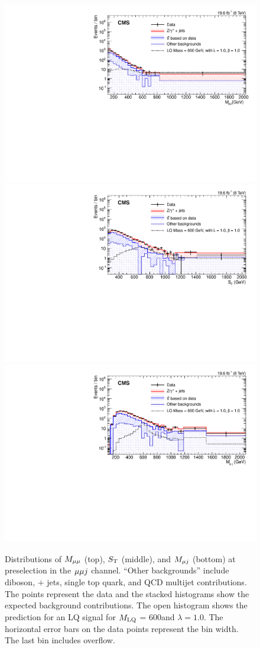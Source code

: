 \begin{figure}[!htb]
       \centering
       {\includegraphics[width=.75\textwidth]{Figures/Figures_mumu_M_muon1muon2_Preselection.pdf}}
       {\includegraphics[width=.75\textwidth]{Figures/Figures_mumu_ST_pf_mumu_single_Preselection.pdf}}
       {\includegraphics[width=.75\textwidth]{Figures/Figures_mumu_M_singleLQ_mupfjet_Masshigh_Preselection.pdf}}
       \caption{Distributions of $M_{{\mu} {\mu}}$ (top), $S_{\mathrm{T}}$ (middle), and $M_{{\mu} j}$ (bottom) at preselection in the ${\mu} {\mu} j$ channel.  ``Other backgrounds'' include diboson, \PW $+$ jets, single top quark, and QCD multijet contributions.  The points represent the data and the stacked histograms show the expected background contributions.  The open histogram shows the prediction for an LQ signal for $M_{\text{\text{LQ}}}$ = 600\GeV and $\lambda=1.0$.  The horizontal error bars on the data points represent the bin width.  The last bin includes overflow. \label{figapp:muonmisc}}
\end{figure}

